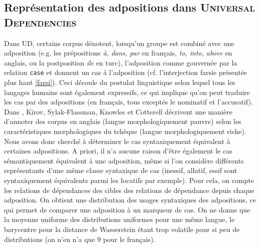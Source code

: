 \documentclass{cours}
\begin{document}
\subsection{Représentation des adpositions dans \textsc{Universal Dependencies}}\label{subsec:adpos}
Dans UD, certains corpus dénotent, lorsqu'un groupe est combiné avec une adposition (e.g. les prépositions \textsl{à, dans, par} en français, \textsl{to, into, above} en anglais, ou la postposition \textsl{ile} en turc), l'adposition comme gouvernée par la relation \texttt{case} et donnent un cas à l'adposition (cf. l'interjection farsie présentée plus haut \ref{farsi}).
Ceci découle du postulat linguistique selon lequel tous les langages humains sont également expressifs, ce qui implique qu'on peut traduire les cas par des adpositions (en français, tous exceptés le nominatif et l'accusatif).
Dans \cite{morphenglish}, Kirov, Sylak-Flassman, Knowles et Cotterell décrivent une manière d'annoter des corpus en anglais (langue morphologiquement pauvre) selon les caractéristiques morphologiques du tchèque (langue morphologiquement riche). \\
Nous avons donc cherché à déterminer le cas syntaxiquement équivalent à certaines adpositions.
A priori, il n'a aucune raison d'être également le cas sémantiquement équivalent à une adposition, même si l'on considère différents représentants d'une même classe syntaxique de cas (inessif, allatif, essif sont syntaxiquement équivalents parmi les locatifs par exemple).
Pour cela, on compte les relations de dépendances des cibles des relations de dépendance depuis chaque adposition.
On obtient une distribution des usages syntaxiques des adpositions, ce qui permet de comparer une adposition à un marqueur de cas.
On ne donne que la moyenne uniforme des distributions uniformes pour une même langue, le barycentre pour la distance de Wasserstein étant trop volatile pour si peu de distributions (on n'en n'a que 9 pour le français).
\end{document}
